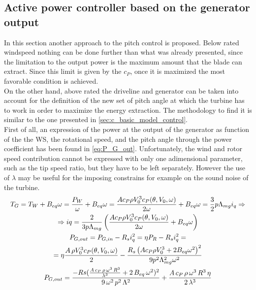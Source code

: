 \subsection{Active power controller based on the generator output}\label{subsec:method_control_P_GE}
In this section another approach to the pitch control is proposed. 
Below rated windspeed nothing can be done further than what was already presented, since the limitation to the output power is the maximum amount that the blade can extract. Since this limit is given by the $c_P$, once it is maximized the most favorable condition is achieved. \\
On the other hand, above rated the driveline and generator can be taken into account for the definition of the new set of pitch angle at which the turbine has to work in order to maximize the energy extraction. The methodology to find it is similar to the one presented in \autoref{sec:c_basic_model_control}.  \\
First of all, an expression of the power at the output of the generator as function of the the WS, the rotational speed, and the pitch angle through the power coefficient has been found in \autoref{eq:P_G_out}.  Unfortunately, the wind and rotor speed contribution cannot be expressed with only one adimensional parameter, such as the tip speed ratio, but they have to be left separately. However the use of $\lambda$ may be useful for the imposing constrains for example on the sound noise of the turbine.
\begin{gather} 
  T_G = T_W + B_{eq}\omega = \frac{P_W}{\omega} + B_{eq}\omega = \frac{A c_P \rho V_0^3 c_P(\theta, V_0, \omega)}{2\omega} + B_{eq}\omega = \frac{3}{2}p\Lambda_{mg}i_q \Rightarrow \\ \notag
  \Rightarrow iq = \frac{2}{3p\Lambda_{mg}}\left(\frac{A c_P \rho V_0^3 c_P(\theta, V_0, \omega)}{2\omega} + B_{eq}\omega\right) \\ 
  P_{G, out} = P_{G, in} - R_s i_q^2 = \eta P_R - R_s i_q^2 = \\ \notag
   = \eta \frac{A \, \rho V_0^3 c_P(\theta, V_0, \omega)}{2} - \frac{R_s \left(A c_P \rho V_0^3 + 2 B_{eq}\omega^2 \right)^2}{9p^2\Lambda_{mg}^2\omega^2} \label{eq:P_G_out} \\
   P_{G, out} = \frac{-Rs(\frac{A\,c_P\,\rho\,\omega^3\,R^3}{\lambda^3} + 2\,B_{eq}\,\omega^2)^2}{9\,\omega^2\,p^2\,\Lambda^2} + \frac{A\,c_P\,\rho\,\omega^3\,R^3\,\eta}{2\,\lambda^3}\label{eq:P_G_out_lambda}
\end{gather}

